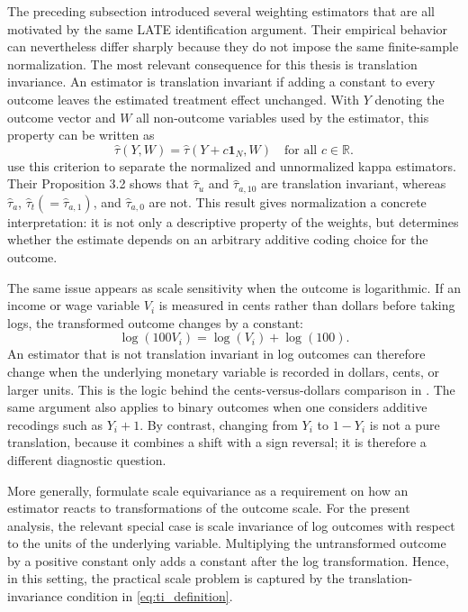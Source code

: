 \documentclass{article}
\begin{document}
The preceding subsection introduced several weighting estimators that are all
motivated by the same LATE identification argument. Their empirical behavior can
nevertheless differ sharply because they do not impose the same finite-sample
normalization. The most relevant consequence for this thesis is translation
invariance. An estimator is translation invariant if adding a constant to every
outcome leaves the estimated treatment effect unchanged. With \(Y\) denoting the
outcome vector and \(W\) all non-outcome variables used by the estimator, this
property can be written as
\begin{equation}
    \hat\tau(Y,W)=\hat\tau(Y+c\mathbf{1}_N,W)
    \quad\text{for all } c\in\mathbb{R}.
    \label{eq:ti_definition}
\end{equation}
\citet{sloczynski2025abadie} use this criterion to separate the normalized and
unnormalized kappa estimators. Their Proposition 3.2 shows that
\(\hat\tau_u\) and \(\hat\tau_{a,10}\) are translation invariant, whereas
\(\hat\tau_a\), \(\hat\tau_t(=\hat\tau_{a,1})\), and \(\hat\tau_{a,0}\) are
not. This result gives normalization a concrete interpretation: it is not only a
descriptive property of the weights, but determines whether the estimate depends
on an arbitrary additive coding choice for the outcome.

The same issue appears as scale sensitivity when the outcome is logarithmic. If
an income or wage variable \(V_i\) is measured in cents rather than dollars before
taking logs, the transformed outcome changes by a constant:
\begin{equation}
    \log(100V_i)=\log(V_i)+\log(100).
    \label{eq:log_units}
\end{equation}
An estimator that is not translation invariant in log outcomes can therefore
change when the underlying monetary variable is recorded in dollars, cents, or
larger units. This is the logic behind the cents-versus-dollars comparison in
\citet{sloczynski2025abadie}. The same argument also applies to binary outcomes
when one considers additive recodings such as \(Y_i+1\). By contrast, changing
from \(Y_i\) to \(1-Y_i\) is not a pure translation, because it combines a shift
with a sign reversal; it is therefore a different diagnostic question.

More generally, \citet{sloczynski2025abadie} formulate scale equivariance as a
requirement on how an estimator reacts to transformations of the outcome scale.
For the present analysis, the relevant special case is scale invariance of log
outcomes with respect to the units of the underlying variable. Multiplying the
untransformed outcome by a positive constant only adds a constant after the log
transformation. Hence, in this setting, the practical scale problem is captured
by the translation-invariance condition in \eqref{eq:ti_definition}.
\end{document}
